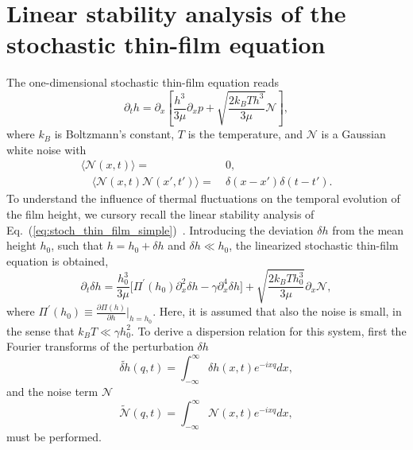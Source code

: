\section{Linear stability analysis of the stochastic thin-film equation}\label{sec:stoch_thin_film}
The one-dimensional stochastic thin-film equation reads~\cite{grunThinFilmFlowInfluenced2006, meckeThermalFluctuationsThin2005}
\begin{equation}\label{eq:stoch_thin_film_simple}
    \partial_t h = \partial_x \left[\frac{h^3}{3\mu}\partial_x p + \sqrt{\frac{2k_BTh^3}{3\mu}}\mathcal{N}\right],
\end{equation}
where $k_B$ is Boltzmann's constant, $T$ is the temperature, and $\mathcal{N}$ is a Gaussian white noise with
\begin{align}\label{eq:correlation}
    \langle\mathcal{N}(x,t)\rangle =&~0,\\ 
    \quad \langle\mathcal{N}(x,t)\mathcal{N}(x',t')\rangle =&~\delta(x-x')\delta(t-t').
\end{align}
To understand the influence of thermal fluctuations on the temporal evolution of the film height, we cursory recall the linear stability analysis of Eq.~(\ref{eq:stoch_thin_film_simple})~\cite{zhangMolecularSimulationThin2019, diezMetallicthinfilmInstabilitySpatially2016}.
Introducing the deviation $\delta h$ from the mean height $h_0$, such that $h = h_0 + \delta h$ and $\delta h \ll h_0$, 
the linearized stochastic thin-film equation is obtained,
\begin{equation}\label{eq:linearstability_realspace}
    \partial_t \delta h = \frac{h_0^3}{3\mu}\Big[\Pi^{\prime}(h_0)\partial_x^2\delta h - \gamma \partial_x^4\delta h\Big] + \sqrt{\frac{2k_BT h_0^3}{3\mu}} \partial_x \mathcal{N},
\end{equation}
where $\Pi^{\prime}(h_0) \equiv \frac{\partial \Pi(h)}{\partial h}\bigg\rvert_{h=h_0}$.
Here, it is assumed that also the noise is small, in the sense that $k_B T \ll \gamma h_0^2$.
To derive a dispersion relation for this system, first the Fourier transforms of the perturbation $\delta h$  
\begin{equation}\label{eq:fourier_delta_h}
    \tilde{\delta h}(q,t) = \int_{-\infty}^{\infty} \delta h(x,t) e^{-ixq} dx,
\end{equation}
and the noise term $\mathcal{N}$
\begin{equation}\label{eq:fourier_noise}
    \tilde{\mathcal{N}}(q,t) = \int_{-\infty}^{\infty} \mathcal{N}(x,t) e^{-ixq} dx,
\end{equation}
must be performed.

